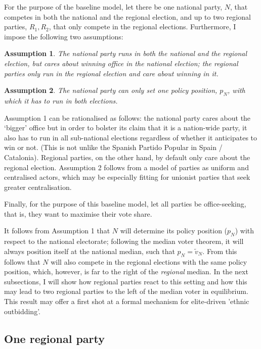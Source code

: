 \documentclass[11pt]{article}
\newtheorem{assumption}{Assumption}
\begin{document}
For the purpose of the baseline model, let there be one national party, $N$, that competes in both the national and the regional election, and up to two regional parties, $R_1, R_2$, that only compete in the regional elections. Furthermore, I impose the following two assumptions:

\begin{assumption}
    The national party runs in both the national and the regional election, but cares about winning office in the national election; the regional parties only run in the regional election and care about winning in it.
\end{assumption}
\begin{assumption}
    The national party can only set one policy position, $p_N$, with which it has to run in both elections.
\end{assumption}

Assumption 1 can be rationalised as follows: the national party cares about the `bigger' office but in order to bolster its claim that it is a nation-wide party, it also has to run in all sub-national elections regardless of whether it anticipates to win or not. (This is not unlike the Spanish Partido Popular in Spain / Catalonia). Regional parties, on the other hand, by default only care about the regional election. Assumption 2 follows from a model of parties as uniform and centralised actors, which may be especially fitting for unionist parties that seek greater centralisation.

Finally, for the purpose of this baseline model, let all parties be office-seeking, that is, they want to maximise their vote share.

It follows from Assumption 1 that $N$ will determine its policy position ($p_N$) with respect to the national electorate; following the median voter theorem, it will always position itself at the national median, such that $p_N = \tilde{v}_N$. From this follows that $N$ will also compete in the regional elections with the same policy position, which, however, is far to the right of the \textit{regional} median. In the next subsections, I will show how regional parties react to this setting and how this may lead to two regional parties to the left of the median voter in equilibrium. This result may offer a first shot at a formal mechanism for elite-driven 'ethnic outbidding'.


\subsection{One regional party}
\end{document}
